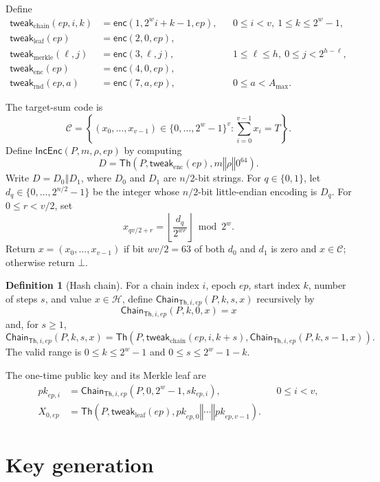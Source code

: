 \documentclass[11pt]{article}
\theoremstyle{definition}
\newtheorem{definition}{Definition}[section]
\theoremstyle{plain}
\theoremstyle{remark}
\newcommand{\Th}{\mathsf{Th}}
\newcommand{\IncEnc}{\mathsf{IncEnc}}
\newcommand{\Chain}{\mathsf{Chain}}
\newcommand{\concat}{\mathbin\Vert}
\newcommand{\ep}{\mathit{ep}}
\newcommand{\amax}{A_{\max}}
\begin{document}
Define
\[
\begin{aligned}
  \mathsf{tweak}_{\mathrm{chain}}(\ep,i,k) &= \mathsf{enc}(1,2^wi+k-1,\ep), &&0\leq i<v,\ 1\leq k\leq2^w-1,\\
  \mathsf{tweak}_{\mathrm{leaf}}(\ep) &= \mathsf{enc}(2,0,\ep),\\
  \mathsf{tweak}_{\mathrm{merkle}}(\ell,j) &= \mathsf{enc}(3,\ell,j), &&1\leq\ell\leq h,\ 0\leq j<2^{h-\ell},\\
  \mathsf{tweak}_{\mathrm{enc}}(\ep) &= \mathsf{enc}(4,0,\ep),\\
  \mathsf{tweak}_{\mathrm{rnd}}(\ep,a) &= \mathsf{enc}(7,a,\ep), &&0\leq a<\amax.
\end{aligned}
\]

The target-sum code is~\cite{DKKW25}
\[
  \mathcal C=\left\{(x_0,\ldots,x_{v-1})\in\{0,\ldots,2^w - 1\}^{v}:\sum_{i=0}^{v-1}x_i=T\right\}.
\]
Define $\IncEnc(P,m,\rho,\ep)$ by computing
\[
  D=\Th\!\left(P,\mathsf{tweak}_{\mathrm{enc}}(\ep),m\concat\rho\concat 0^{64}\right).
\]
Write $D=D_0\concat D_1$, where $D_0$ and $D_1$ are $n/2$-bit strings. For $q\in\{0,1\}$, let $d_q\in\{0,\ldots,2^{n/2}-1\}$ be the integer whose $n/2$-bit little-endian encoding is $D_q$. For $0\leq r<v/2$, set
\[
  x_{qv/2+r}=\left\lfloor\frac{d_q}{2^{wr}}\right\rfloor\bmod 2^w.
\]
Return $x=(x_0,\ldots,x_{v-1})$ if bit $wv/2=63$ of both $d_0$ and $d_1$ is zero and $x\in\mathcal C$; otherwise return $\bot$.

\begin{definition}[Hash chain]
For a chain index $i$, epoch $\ep$, start index $k$, number of steps $s$, and value $x\in\mathcal H$, define $\Chain_{\Th,i,\ep}(P,k,s,x)$ recursively by
\[
  \Chain_{\Th,i,\ep}(P,k,0,x)=x
\]
and, for $s\geq1$,
\[
  \Chain_{\Th,i,\ep}(P,k,s,x)=\Th\!\left(P,\mathsf{tweak}_{\mathrm{chain}}(\ep,i,k+s),\Chain_{\Th,i,\ep}(P,k,s-1,x)\right).
\]
The valid range is $0\leq k\leq2^w-1$ and $0\leq s\leq2^w-1-k$.
\end{definition}

The one-time public key and its Merkle leaf are
\[
\begin{aligned}
  \mathit{pk}_{\ep,i} &= \Chain_{\Th,i,\ep}(P,0,2^w-1,\mathit{sk}_{\ep,i}), &&0\leq i<v,\\
  X_{0,\ep} &= \Th\!\left(P,\mathsf{tweak}_{\mathrm{leaf}}(\ep),\mathit{pk}_{\ep,0}\concat\cdots\concat\mathit{pk}_{\ep,v-1}\right).
\end{aligned}
\]

\section{Key generation}
\end{document}
